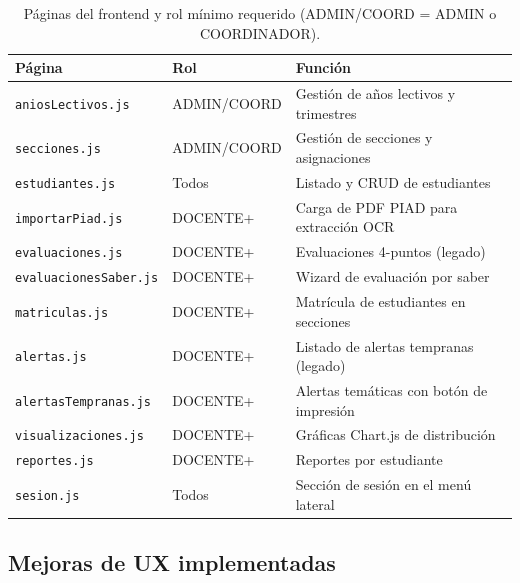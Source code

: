 \documentclass[11pt,a4paper,oneside]{article}
\newcommand{\code}[1]{\texttt{\small #1}}
\begin{document}
\begin{table}[h]\centering\small\renewcommand{\arraystretch}{1.15}
\begin{tabular}{@{}p{4.6cm} p{2.0cm} p{6.5cm}@{}}
\toprule
\textbf{Página} & \textbf{Rol} & \textbf{Función} \\
\midrule
\code{aniosLectivos.js}      & ADMIN/COORD       & Gestión de años lectivos y trimestres \\
\code{secciones.js}          & ADMIN/COORD       & Gestión de secciones y asignaciones \\
\code{estudiantes.js}        & Todos             & Listado y CRUD de estudiantes \\
\code{importarPiad.js}       & DOCENTE+          & Carga de PDF PIAD para extracción OCR \\
\code{evaluaciones.js}       & DOCENTE+          & Evaluaciones 4-puntos (legado) \\
\code{evaluacionesSaber.js}  & DOCENTE+          & Wizard de evaluación por saber \\
\code{matriculas.js}         & DOCENTE+          & Matrícula de estudiantes en secciones \\
\code{alertas.js}            & DOCENTE+          & Listado de alertas tempranas (legado) \\
\code{alertasTempranas.js}   & DOCENTE+          & Alertas temáticas con botón de impresión \\
\code{visualizaciones.js}    & DOCENTE+          & Gráficas Chart.js de distribución \\
\code{reportes.js}           & DOCENTE+          & Reportes por estudiante \\
\code{sesion.js}             & Todos             & Sección de sesión en el menú lateral \\
\bottomrule
\end{tabular}
\caption{Páginas del frontend y rol mínimo requerido (ADMIN/COORD = ADMIN o COORDINADOR).}
\end{table}

\subsection{Mejoras de UX implementadas}
\end{document}
